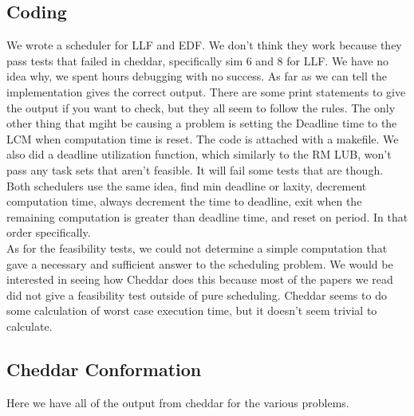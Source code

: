 \documentclass{article}
\begin{document}
\subsection*{Coding}
We wrote a scheduler for LLF and EDF. We don't think they work because they pass tests that failed in cheddar, specifically sim 6 and 8 for LLF. We have no idea why, we spent hours debugging with no success. As far as we can tell the implementation gives the correct output. There are some print statements to give the output if you want to check, but they all seem to follow the rules. The only other thing that mgiht be causing a problem is setting the Deadline time to the LCM when computation
time is reset. The code is attached with a makefile. We also did a deadline utilization function, which similarly to
the RM LUB, won't pass any task sets that aren't feasible. It will fail some tests that are though. Both schedulers use the same idea, find min deadline or laxity, decrement computation time, always decrement the time to deadline, exit when the remaining computation is greater than deadline time, and reset on period. In that order specifically.\\

As for the feasibility tests, we could not determine a simple computation that gave a necessary and sufficient answer to the scheduling problem. We would be interested in seeing how Cheddar does this because most of the papers we read did not give a feasibility test outside of pure scheduling. Cheddar seems to do some calculation of worst case execution time, but it doesn't seem trivial to calculate.
\subsection*{Cheddar Conformation}
Here we have all of the output from cheddar for the various problems.
\end{document}
